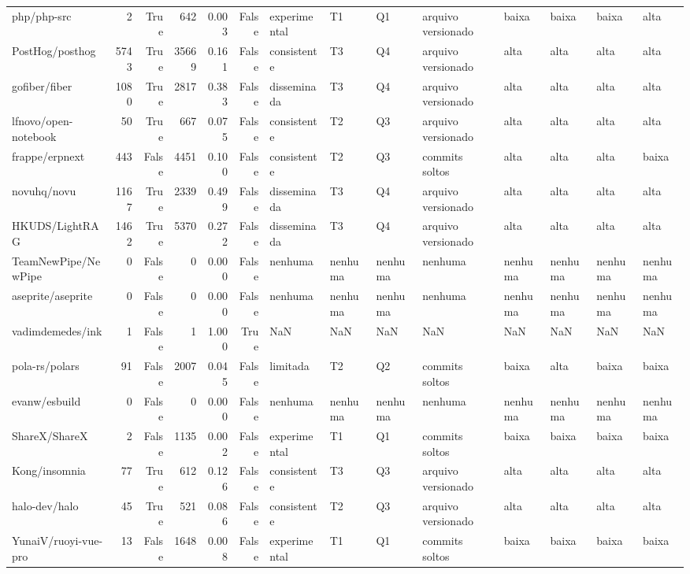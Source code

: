 \begin{tabular}{lrrrrrllllllll}
php/php-src & 2 & True & 642 & 0.003 & False & experimental & T1 & Q1 & arquivo versionado & baixa & baixa & baixa & alta \\
PostHog/posthog & 5743 & True & 35669 & 0.161 & False & consistente & T3 & Q4 & arquivo versionado & alta & alta & alta & alta \\
gofiber/fiber & 1080 & True & 2817 & 0.383 & False & disseminada & T3 & Q4 & arquivo versionado & alta & alta & alta & alta \\
lfnovo/open-notebook & 50 & True & 667 & 0.075 & False & consistente & T2 & Q3 & arquivo versionado & alta & alta & alta & alta \\
frappe/erpnext & 443 & False & 4451 & 0.100 & False & consistente & T2 & Q3 & commits soltos & alta & alta & alta & baixa \\
novuhq/novu & 1167 & True & 2339 & 0.499 & False & disseminada & T3 & Q4 & arquivo versionado & alta & alta & alta & alta \\
HKUDS/LightRAG & 1462 & True & 5370 & 0.272 & False & disseminada & T3 & Q4 & arquivo versionado & alta & alta & alta & alta \\
TeamNewPipe/NewPipe & 0 & False & 0 & 0.000 & False & nenhuma & nenhuma & nenhuma & nenhuma & nenhuma & nenhuma & nenhuma & nenhuma \\
aseprite/aseprite & 0 & False & 0 & 0.000 & False & nenhuma & nenhuma & nenhuma & nenhuma & nenhuma & nenhuma & nenhuma & nenhuma \\
vadimdemedes/ink & 1 & False & 1 & 1.000 & True & NaN & NaN & NaN & NaN & NaN & NaN & NaN & NaN \\
pola-rs/polars & 91 & False & 2007 & 0.045 & False & limitada & T2 & Q2 & commits soltos & baixa & alta & baixa & baixa \\
evanw/esbuild & 0 & False & 0 & 0.000 & False & nenhuma & nenhuma & nenhuma & nenhuma & nenhuma & nenhuma & nenhuma & nenhuma \\
ShareX/ShareX & 2 & False & 1135 & 0.002 & False & experimental & T1 & Q1 & commits soltos & baixa & baixa & baixa & baixa \\
Kong/insomnia & 77 & True & 612 & 0.126 & False & consistente & T3 & Q3 & arquivo versionado & alta & alta & alta & alta \\
halo-dev/halo & 45 & True & 521 & 0.086 & False & consistente & T2 & Q3 & arquivo versionado & alta & alta & alta & alta \\
YunaiV/ruoyi-vue-pro & 13 & False & 1648 & 0.008 & False & experimental & T1 & Q1 & commits soltos & baixa & baixa & baixa & baixa \\

\end{tabular}
